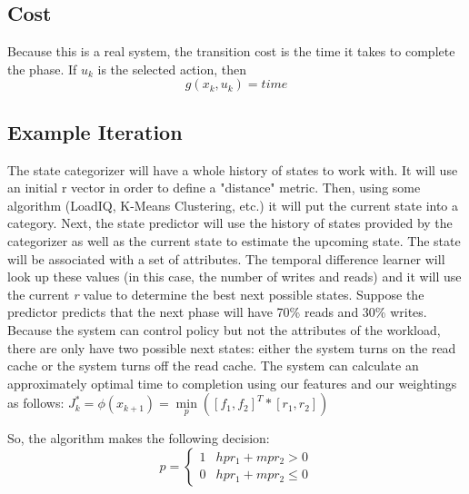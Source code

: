 \documentclass[11pt]{article}
\numberwithin{figure}{section}
\begin{document}
		\subsection{Cost}
			Because this is a real system, the transition cost is the time it takes to complete the phase. If \begin{math}u_k\end{math} is the selected action, then
			\begin{equation}
			g(x_k, u_k)=time
			\end{equation}
		\subsection{Example Iteration}
			The state categorizer will have a whole history of states to work with. It will use an initial r vector in order to define a "distance" metric. Then, using some algorithm (LoadIQ, K-Means Clustering, etc.) it will put the current state into a category. Next, the state predictor will use the history of states provided by the categorizer as well as the current state to estimate the upcoming state. The state will be associated with a set of attributes. The temporal difference learner will look up these values (in this case, the number of writes and reads) and it will use the current \textit{r} value to determine the best next possible states. Suppose the predictor predicts that the next phase will have 70\% reads and 30\% writes. Because the system can control policy but not the attributes of the workload, there are only have two possible next states: either the system turns on the read cache or the system turns off the read cache. The system can calculate an approximately optimal time to completion using our features and our weightings as follows:
			\begin{math}
			J^*_k=\phi(x_{k+1})=\min\limits_{p}([f_1, f_2]^T*[r_1, r_2])
			\end{math}
			
			So, the algorithm makes the following decision:
			\begin{equation}
				p=
				\begin{cases}
				1 & hpr_1+mpr_2>0 \\
				0 & hpr_1+mpr_2\leq0
				\end{cases}
			\end{equation}
			
\end{document}

